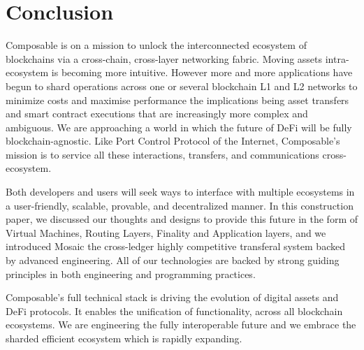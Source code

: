 \section{Conclusion\label{sec:conclusion}}

Composable is on a mission to unlock the interconnected ecosystem of blockchains via a cross-chain, cross-layer networking fabric.
%
Moving assets intra-ecosystem is becoming more intuitive. However more and more applications have begun to shard operations across one or several blockchain L1 and L2 networks to minimize costs and maximise performance the implications being asset transfers and smart contract executions that are increasingly more complex and ambiguous. We are approaching a world in which the future of DeFi will be fully blockchain-agnostic.
%
Like Port Control Protocol of the Internet, Composable's mission is to service all these interactions, transfers, and communications cross-ecosystem.

Both developers and users will seek ways to interface with multiple ecosystems in a user-friendly, scalable, provable, and decentralized manner. In this construction paper, we discussed our thoughts and designs to provide this future in the form of Virtual Machines, Routing Layers, Finality and Application layers, and we introduced Mosaic the cross-ledger highly competitive transferal system backed by advanced engineering. All of our technologies are backed by strong guiding principles in both engineering and programming practices.

Composable's full technical stack is driving the evolution of digital assets and DeFi protocols. It enables the unification of functionality, across all blockchain ecosystems. We are engineering the fully interoperable future and we embrace the sharded efficient ecosystem which is rapidly expanding.
